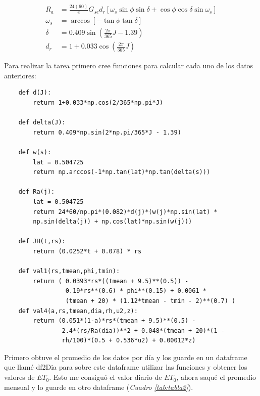 \documentclass[12pt]{article}
\begin{document}
        \begin{equation*}
        \begin{split}
            R_a &= \frac{24(60)}{\pi}G_{se}d_r[\omega_s\sin{\phi}\sin{\delta} + \cos{\phi}\cos{\delta}\sin{\omega_s}]\\
            \omega_s &= \arccos[-\tan\phi\tan\delta]\\
            \delta &= 0.409\sin{(\frac{2\pi}{365}J - 1.39)}\\
            d_r &= 1 + 0.033\cos{(\frac{2\pi}{365}J)}
        \end{split}
        \end{equation*}
        
Para realizar la tarea primero cree funciones para calcular cada uno de los datos anteriores:
\begin{verbatim}
    def d(J):
        return 1+0.033*np.cos(2/365*np.pi*J)
    
    def delta(J):
        return 0.409*np.sin(2*np.pi/365*J - 1.39)
    
    def w(s):
        lat = 0.504725
        return np.arccos(-1*np.tan(lat)*np.tan(delta(s)))
        
    def Ra(j):
        lat = 0.504725
        return 24*60/np.pi*(0.082)*d(j)*(w(j)*np.sin(lat) * 
        np.sin(delta(j)) + np.cos(lat)*np.sin(w(j)))
    
    def JH(t,rs):
        return (0.0252*t + 0.078) * rs
    
    def val1(rs,tmean,phi,tmin):
        return ( 0.0393*rs*((tmean + 9.5)**(0.5)) - 
                 0.19*rs**(0.6) * phi**(0.15) + 0.0061 * 
                 (tmean + 20) * (1.12*tmean - tmin - 2)**(0.7) )
    def val4(a,rs,tmean,dia,rh,u2,z):
        return (0.051*(1-a)*rs*(tmean + 9.5)**(0.5) - 
                2.4*(rs/Ra(dia))**2 + 0.048*(tmean + 20)*(1 - 
                rh/100)*(0.5 + 0.536*u2) + 0.00012*z)
\end{verbatim}
Primero obtuve el promedio de los datos por d\'ia y los guarde en un dataframe que llam\'e df2Dia para sobre este dataframe utilizar las funciones y obtener los valores de $ET_0$. Esto me consigu\'o el valor diario de $ET_0$, ahora saqu\'e el promedio mensual y lo guarde en otro dataframe (\textit{Cuadro \ref{tab:tabla2}}).\\
\end{document}
